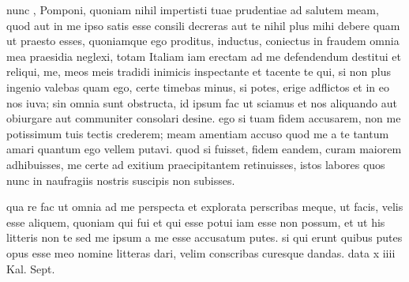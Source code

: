  nunc , Pomponi, quoniam nihil impertisti tuae prudentiae ad salutem meam, quod aut in me ipso satis esse consili decreras aut te nihil plus mihi debere quam ut praesto esses, quoniamque ego proditus, inductus, coniectus in fraudem omnia mea praesidia neglexi, totam Italiam iam erectam ad me defendendum destitui et reliqui, me, meos meis tradidi inimicis inspectante et tacente te qui, si non plus ingenio valebas quam ego, certe timebas minus, si potes, erige adflictos et in eo nos iuva; sin omnia sunt obstructa, id ipsum fac ut sciamus et nos aliquando aut obiurgare aut communiter consolari desine. ego si tuam fidem accusarem, non me potissimum tuis tectis crederem; meam amentiam accuso quod me a te tantum amari quantum ego vellem putavi. quod si fuisset, fidem eandem, curam maiorem adhibuisses, me certe ad exitium praecipitantem retinuisses, istos labores quos nunc in naufragiis nostris suscipis non subisses.

 qua re fac ut omnia ad me perspecta et explorata perscribas meque, ut facis, velis esse aliquem, quoniam qui fui et qui esse potui iam esse non possum, et ut his litteris non te sed me ipsum a me esse accusatum putes. si qui erunt quibus putes opus esse meo nomine litteras dari, velim conscribas curesque dandas. data x iiii Kal. Sept.
